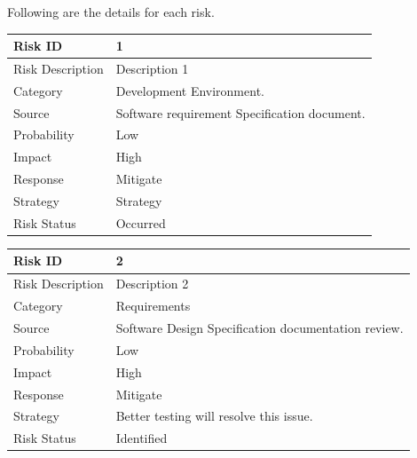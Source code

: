 \documentclass[oneside,a4paper,12pt]{report}
\begin{document}
Following are the details for each risk.
\begin{table}[!htbp]
\begin{center}
\def\arraystretch{1.5}
\begin{tabularx}{\textwidth}{| l | X |}
\hline 
Risk ID	& 1 \\ \hline
Risk Description	& Description 1 \\ \hline
Category	& Development Environment. \\ \hline
Source	& Software requirement Specification document. \\ \hline
Probability	& Low \\ \hline
Impact	& High \\ \hline
Response	& Mitigate \\ \hline
Strategy	& Strategy \\ \hline
Risk Status	& Occurred \\ \hline
\end{tabularx}
\end{center}
\label{tab:risk1}
\end{table}

\begin{table}[!htbp]
\begin{center}
\def\arraystretch{1.5}
\begin{tabularx}{\textwidth}{| l | X |}
\hline 
Risk ID	& 2 \\ \hline
Risk Description	& Description 2 \\ \hline
Category	& Requirements \\ \hline
Source	& Software Design Specification documentation review. \\ \hline
Probability	& Low \\ \hline
Impact	& High \\ \hline
Response	& Mitigate \\ \hline
Strategy	& Better testing will resolve this issue.  \\ \hline
Risk Status	& Identified \\ \hline
\end{tabularx}
\end{center}
\label{tab:risk2}
\end{table}
\end{document}
